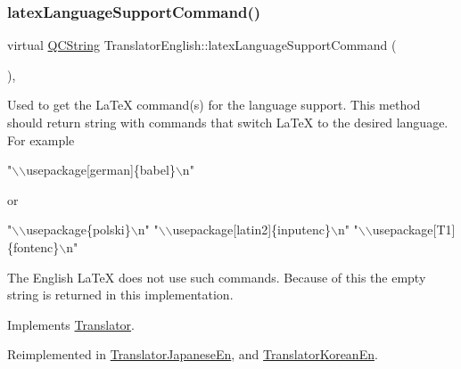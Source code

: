 \mbox{\label{class_translator_english_a48ecd4aaa9aa68947257ff29016a808a}} 
\subsubsection{\texorpdfstring{latexLanguageSupportCommand()}{latexLanguageSupportCommand()}}
{\footnotesize\ttfamily virtual \mbox{\hyperlink{class_q_c_string}{Q\+C\+String}} Translator\+English\+::latex\+Language\+Support\+Command (\begin{DoxyParamCaption}{ }\end{DoxyParamCaption})\hspace{0.3cm}{\ttfamily [inline]}, {\ttfamily [virtual]}}

Used to get the La\+TeX command(s) for the language support. This method should return string with commands that switch La\+TeX to the desired language. For example 
\begin{DoxyPre}"\(\backslash\)\(\backslash\)usepackage[german]\{babel\}\(\backslash\)n"
 \end{DoxyPre}
 or 
\begin{DoxyPre}"\(\backslash\)\(\backslash\)usepackage\{polski\}\(\backslash\)n"
 "\(\backslash\)\(\backslash\)usepackage[latin2]\{inputenc\}\(\backslash\)n"
 "\(\backslash\)\(\backslash\)usepackage[T1]\{fontenc\}\(\backslash\)n"
 \end{DoxyPre}


The English La\+TeX does not use such commands. Because of this the empty string is returned in this implementation. 

Implements \mbox{\hyperlink{class_translator}{Translator}}.



Reimplemented in \mbox{\hyperlink{class_translator_japanese_en_a82a0008e9f9183374a7581124053ca4f}{Translator\+Japanese\+En}}, and \mbox{\hyperlink{class_translator_korean_en_a0db5fe9ae0843e3f89b0b9770ba32d32}{Translator\+Korean\+En}}.

\mbox{\label{class_translator_english_af5810369a943f7e4ef3f8d5f18c41aef}} 
